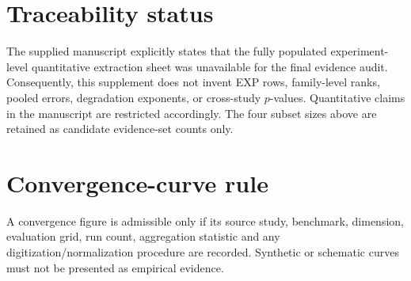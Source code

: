 \documentclass[10pt]{article}
\begin{document}
\section*{Traceability status}
The supplied manuscript explicitly states that the fully populated experiment-level quantitative extraction sheet was unavailable for the final evidence audit. Consequently, this supplement does not invent EXP rows, family-level ranks, pooled errors, degradation exponents, or cross-study $p$-values. Quantitative claims in the manuscript are restricted accordingly. The four subset sizes above are retained as candidate evidence-set counts only.

\section*{Convergence-curve rule}
A convergence figure is admissible only if its source study, benchmark, dimension, evaluation grid, run count, aggregation statistic and any digitization/normalization procedure are recorded. Synthetic or schematic curves must not be presented as empirical evidence.
\end{document}
